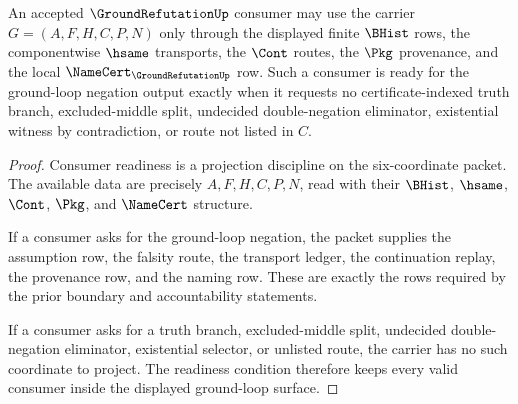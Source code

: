 \begin{theorem}
\label{thm:ground-refutation-consumer-readiness}
An accepted $\GroundRefutationUp$ consumer may use the carrier $G=(A,F,H,C,P,N)$ only through the displayed finite $\BHist$ rows, the componentwise $\hsame$ transports, the $\Cont$ routes, the $\Pkg$ provenance, and the local $\NameCert_{\GroundRefutationUp}$ row. Such a consumer is ready for the ground-loop negation output exactly when it requests no certificate-indexed truth branch, excluded-middle split, undecided double-negation eliminator, existential witness by contradiction, or route not listed in $C$.
\end{theorem}
\begin{proof}
Consumer readiness is a projection discipline on the six-coordinate packet. The available data are precisely $A,F,H,C,P,N$, read with their $\BHist$, $\hsame$, $\Cont$, $\Pkg$, and $\NameCert$ structure.

If a consumer asks for the ground-loop negation, the packet supplies the assumption row, the falsity route, the transport ledger, the continuation replay, the provenance row, and the naming row. These are exactly the rows required by the prior boundary and accountability statements.

If a consumer asks for a truth branch, excluded-middle split, undecided double-negation eliminator, existential selector, or unlisted route, the carrier has no such coordinate to project. The readiness condition therefore keeps every valid consumer inside the displayed ground-loop surface.
\end{proof}

